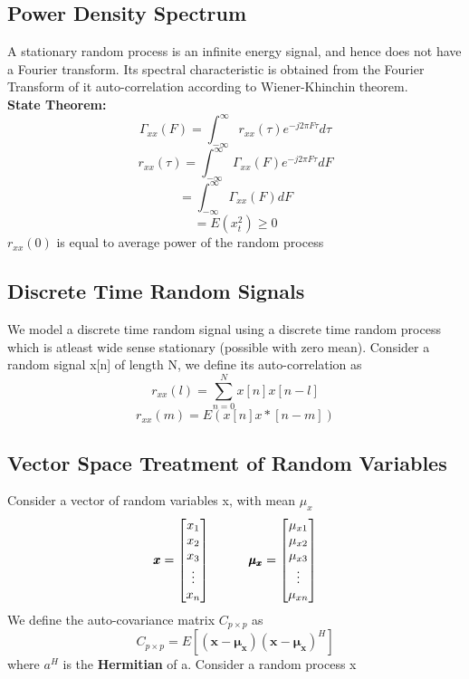 \subsection{Power Density Spectrum}

A stationary random process is an infinite energy signal, and hence does not have a Fourier transform. Its spectral characteristic is obtained from the Fourier Transform of it auto-correlation according to Wiener-Khinchin theorem.
\\ \textbf{State Theorem: } $$ \Gamma_{xx}(F) = \int_{-\infty}^{\infty} r_{xx}(\tau)e^{-j2\pi F\tau} d\tau$$
$$ r_{xx}(\tau) = \int_{-\infty}^{\infty} \Gamma_{xx}(F)e^{-j2\pi F\tau} dF $$
$$ 				= \int_{-\infty}^{\infty} \Gamma_{xx}(F) dF $$
$$ 				= E(x^2_t)  \geq 0 $$
$r_{xx}(0)$ is equal to average power of the random process 



\subsection{Discrete Time Random Signals}
We model a discrete time random signal using a discrete time random process which is atleast wide sense stationary (possible with zero mean).
Consider a random signal x[n] of length N, we define its auto-correlation as 
$$ r_{xx}(l) = \sum_{n=0}^{N} x[n]x[n-l] $$
$$ r_{xx}(m) = E(x[n]x*[n-m]) $$

\subsection{Vector Space Treatment of Random Variables}
Consider a vector of random variables x, with mean $\mu_x$
\[
\pmb{x}=
  \begin{bmatrix}
    x_1 \\
    x_2 \\
    x_3 \\
    \vdots \\
    x_n
  \end{bmatrix}
  \indent\indent \pmb{\mu_x} =
  \begin{bmatrix}
    \mu_{x1} \\
    \mu_{x2} \\
    \mu_{x3} \\
    \vdots \\
    \mu_{xn}
  \end{bmatrix}
\]
We define the auto-covariance matrix $C_{p\times p}$ as $$ C_{p\times p} = E[(\pmb{x}-\pmb{\mu_x})(\pmb{x}-\pmb{\mu_x})^H]$$
where $a^H$ is the \textbf{Hermitian} of a. Consider a random process x

